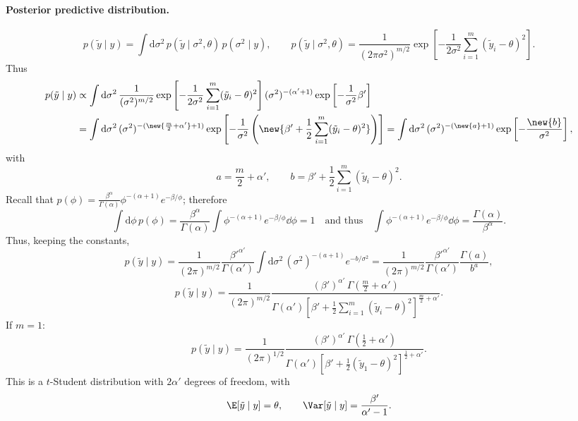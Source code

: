 \paragraph{Posterior predictive distribution.}
\[
p(\tilde y \mid y) = \int \mathrm{d}\sigma^2\,p(\tilde y \mid \sigma^2, \theta)\,p(\sigma^2 \mid y),
\qquad
p(\tilde y \mid \sigma^2, \theta) = \frac{1}{(2\pi\sigma^2)^{m/2}}\exp\left[-\frac{1}{2\sigma^2}\sum_{i=1}^{m}(\tilde y_i - \theta)^2\right].
\]
Thus
\begin{align*}
p(\tilde y \mid y) &\propto \int \mathrm{d}\sigma^2\,\frac{1}{(\sigma^2)^{m/2}}\exp\left[-\frac{1}{2\sigma^2}\sum_{i=1}^{m}(\tilde y_i - \theta)^2\right](\sigma^2)^{-(\alpha'+1)}\exp\left[-\frac{1}{\sigma^2}\beta'\right]\\
&= \int \mathrm{d}\sigma^2\,(\sigma^2)^{-(\new{\frac m2 + \alpha'} + 1)}\exp\left[-\frac{1}{\sigma^2}\left(\new{\beta' + \frac12\sum_{i=1}^{m}(\tilde y_i - \theta)^2}\right)\right]
= \int \mathrm{d}\sigma^2\,(\sigma^2)^{-(\new{a}+1)}\exp\left[-\frac{\new{b}}{\sigma^2}\right],
\end{align*}
with
\[
a = \frac m2 + \alpha', \qquad b = \beta' + \frac12\sum_{i=1}^{m}(\tilde y_i - \theta)^2.
\]
Recall that $p(\phi) = \frac{\beta^\alpha}{\Gamma(\alpha)}\phi^{-(\alpha+1)}e^{-\beta/\phi}$; therefore
\[
\int \mathrm{d}\phi\,p(\phi) = \frac{\beta^\alpha}{\Gamma(\alpha)}\int \phi^{-(\alpha+1)}e^{-\beta/\phi}\dd\phi = 1
\quad\text{and thus}\quad
\int \phi^{-(\alpha+1)}e^{-\beta/\phi}\dd\phi = \frac{\Gamma(\alpha)}{\beta^\alpha}.
\]
Thus, keeping the constants,
\[
p(\tilde y \mid y) = \frac{1}{(2\pi)^{m/2}}\frac{\beta'^{\alpha'}}{\Gamma(\alpha')}\int \mathrm{d}\sigma^2\,(\sigma^2)^{-(a+1)}e^{-b/\sigma^2}
= \frac{1}{(2\pi)^{m/2}}\frac{\beta'^{\alpha'}}{\Gamma(\alpha')}\frac{\Gamma(a)}{b^a},
\]
\[
p(\tilde y \mid y) = \frac{1}{(2\pi)^{m/2}}\frac{(\beta')^{\alpha'}\,\Gamma(\frac m2 + \alpha')}{\Gamma(\alpha')\left[\beta' + \frac12\sum_{i=1}^{m}(\tilde y_i - \theta)^2\right]^{\frac m2 + \alpha'}}.
\]
If $m = 1$:
\[
p(\tilde y \mid y) = \frac{1}{(2\pi)^{1/2}}\frac{(\beta')^{\alpha'}\,\Gamma(\frac12 + \alpha')}{\Gamma(\alpha')\left[\beta' + \frac12(\tilde y_1 - \theta)^2\right]^{\frac12 + \alpha'}}.
\]
This is a $t$-Student distribution with $2\alpha'$ degrees of freedom, with
\[
\E[\tilde y \mid y] = \theta, \qquad \Var[\tilde y \mid y] = \frac{\beta'}{\alpha' - 1}.
\]

